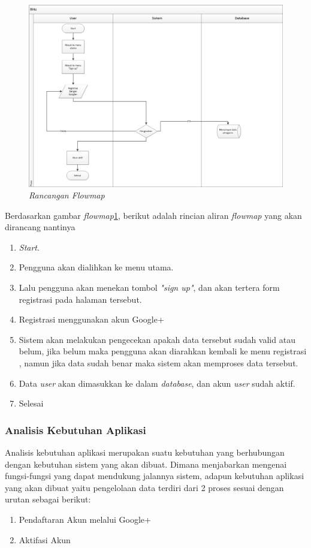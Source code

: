 \begin{figure}[!htbp]
    \centering
    \includegraphics[scale=0.6]{gambar/flow2}
    \caption{\textit{Rancangan Flowmap}}
    \label{flowmapbaru}
\end{figure}
\par
Berdasarkan gambar \textit{flowmap}\ref{flowmapbaru}, berikut adalah rincian aliran \textit{flowmap} yang akan dirancang nantinya
\begin{enumerate}
\item \textit{Start}.
\item Pengguna akan dialihkan ke menu utama.
\item Lalu pengguna akan menekan tombol \textit{"sign up"}, dan akan tertera form registrasi pada halaman tersebut.
\item Registrasi menggunakan akun Google+
\item Sistem akan melakukan pengecekan apakah data tersebut sudah valid atau belum, jika belum maka pengguna akan diarahkan kembali ke menu registrasi , namun jika data sudah benar maka sistem akan memproses data tersebut.
\item Data \textit{user} akan dimasukkan ke dalam \textit{database}, dan akun \textit{user} sudah aktif.
\item Selesai
\end{enumerate}

\subsubsection{Analisis Kebutuhan Aplikasi }
\par
Analisis kebutuhan aplikasi  merupakan suatu kebutuhan yang berhubungan dengan kebutuhan sistem yang akan dibuat. Dimana menjabarkan mengenai fungsi-fungsi yang dapat mendukung jalannya sistem, adapun kebutuhan aplikasi yang akan dibuat yaitu pengelolaan data terdiri dari 2 proses sesuai dengan urutan sebagai berikut:
\begin{enumerate}
\item	Pendaftaran Akun melalui Google+
\item	Aktifasi Akun
\end{enumerate}

